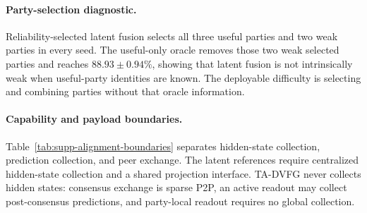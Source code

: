 \documentclass[letterpaper]{article}
\newcommand{\method}{\textsc{TA-DVFG}}
\begin{document}
\paragraph{Party-selection diagnostic.}
Reliability-selected latent fusion selects all three useful parties and two weak
parties in every seed. The useful-only oracle removes those two weak selected
parties and reaches $88.93\pm0.94\%$, showing that latent fusion is not
intrinsically weak when useful-party identities are known. The deployable
difficulty is selecting and combining parties without that oracle information.

\paragraph{Capability and payload boundaries.}
Table~\ref{tab:supp-alignment-boundaries} separates hidden-state collection,
prediction collection, and peer exchange. The latent references require
centralized hidden-state collection and a shared projection interface.
\method{} never collects hidden states: consensus exchange is sparse P2P, an
active readout may collect post-consensus predictions, and party-local readout
requires no global collection.
\end{document}
